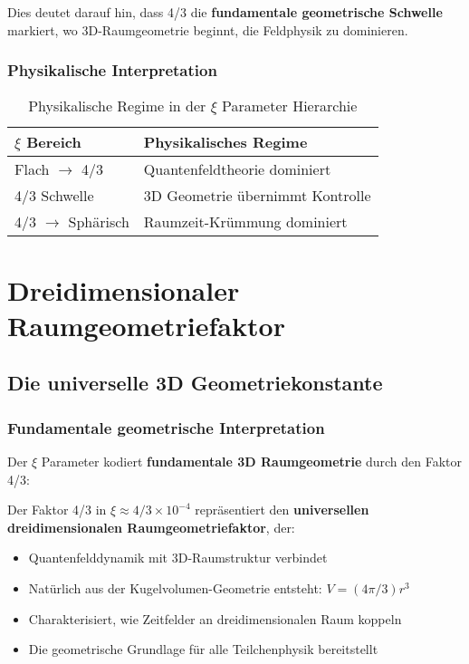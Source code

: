 \documentclass[12pt,a4paper]{article}
\newcommand{\xipar}{\ensuremath{\xi}}
\newcommand{\mypi}{\ensuremath{\pi}}
\newcommand{\mytimes}{\ensuremath{\times}}
\newcommand{\myapprox}{\ensuremath{\approx}}
\newcommand{\myrightarrow}{\ensuremath{\rightarrow}}
\begin{document}
	Dies deutet darauf hin, dass 4/3 die \textbf{fundamentale geometrische Schwelle} markiert, wo 3D-Raumgeometrie beginnt, die Feldphysik zu dominieren.
	
	\subsubsection{Physikalische Interpretation}
	\label{subsubsec:physikalische_interpretation}
	
	\begin{table}[htbp]
		\centering
		\begin{tabular}{ll}
			\toprule
			\textbf{$\xi$ Bereich} & \textbf{Physikalisches Regime} \\
			\midrule
			Flach $\myrightarrow$ 4/3 & Quantenfeldtheorie dominiert \\
			4/3 Schwelle & 3D Geometrie übernimmt Kontrolle \\
			4/3 $\myrightarrow$ Sphärisch & Raumzeit-Krümmung dominiert \\
			\bottomrule
		\end{tabular}
		\caption{Physikalische Regime in der $\xi$ Parameter Hierarchie}
		\label{tab:physikalische_regime}
	\end{table}
	
	\section{Dreidimensionaler Raumgeometriefaktor}
	\label{sec:3d_geometriefaktor}
	
	\subsection{Die universelle 3D Geometriekonstante}
	\label{subsec:universelle_3d_konstante}
	
	\subsubsection{Fundamentale geometrische Interpretation}
	\label{subsubsec:fundamentale_interpretation}
	
	Der $\xi$ Parameter kodiert \textbf{fundamentale 3D Raumgeometrie} durch den Faktor 4/3:
	
	\begin{tcolorbox}[colback=yellow!5!white,colframe=orange!75!black,title=Dreidimensionaler Raumgeometriefaktor]
		Der Faktor 4/3 in $\xipar \myapprox 4/3 \mytimes 10^{-4}$ repräsentiert den \textbf{universellen dreidimensionalen Raumgeometriefaktor}, der:
		\begin{itemize}
			\item Quantenfelddynamik mit 3D-Raumstruktur verbindet
			\item Natürlich aus der Kugelvolumen-Geometrie entsteht: $V = (4\mypi/3)r^3$
			\item Charakterisiert, wie Zeitfelder an dreidimensionalen Raum koppeln
			\item Die geometrische Grundlage für alle Teilchenphysik bereitstellt
		\end{itemize}
	\end{tcolorbox}
	
\end{document}
